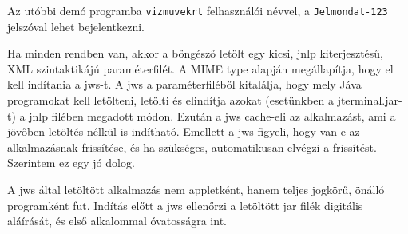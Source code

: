 Az utóbbi demó programba \verb!vizmuvekrt! felhasználói névvel, 
a \verb!Jelmondat-123! jelszóval lehet bejelentkezni.

Ha minden rendben van, akkor  a böngésző
letölt  egy  kicsi, jnlp kiterjesztésű, XML szintaktikájú paraméterfilét.
A MIME type alapján megállapítja, hogy el kell indítania a jws-t.
A jws a paraméterfiléből kitalálja, hogy mely Jáva programokat
kell letölteni, letölti és elindítja azokat (esetünkben a jterminal.jar-t)
a jnlp filében megadott módon. Ezután a jws cache-eli az alkalmazást,
ami a jövőben letöltés nélkül is indítható. Emellett a jws
figyeli, hogy van-e az alkalmazásnak frissítése, és ha szükséges,
automatikusan elvégzi a frissítést. Szerintem ez egy jó dolog.

A jws által letöltött alkalmazás nem appletként, 
hanem teljes jogkörű, önálló programként fut. 
Indítás előtt a jws ellenőrzi a letöltött jar filék 
digitális aláírását, és első alkalommal óvatosságra int.


